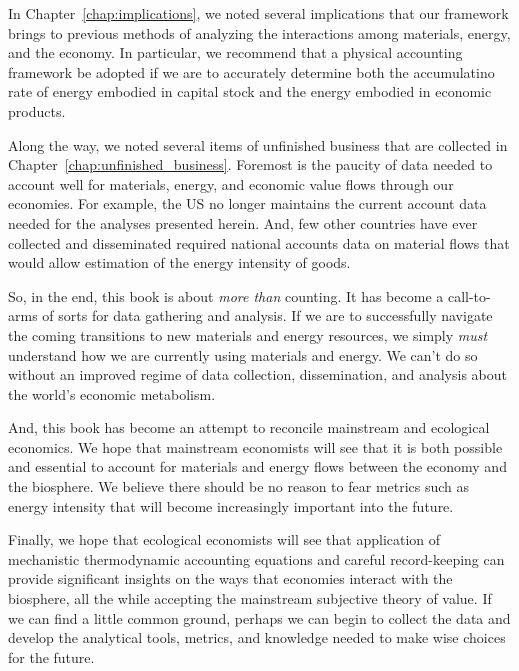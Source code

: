In Chapter~\ref{chap:implications}, we noted several implications
that our framework brings to previous methods of analyzing 
the interactions among materials, energy, and the economy.
In particular, we recommend that a physical accounting framework
be adopted if we are to accurately determine
both the accumulatino rate of energy embodied in capital stock
and the energy embodied in economic products.

Along the way, we noted several items of unfinished business
that are collected in Chapter~\ref{chap:unfinished_business}.
Foremost is the paucity of data
needed to account well for materials, energy, and economic
value flows through our economies.
For example, the US no longer maintains the current account data
needed for the analyses presented herein.
And, few other countries have ever collected and disseminated
required national accounts data on material flows that would allow
estimation of the energy intensity of goods.

\vspace{10 mm}

So, in the end, this book is about \emph{more than} counting.
It has become a call-to-arms of sorts for data gathering and analysis.
If we are to successfully navigate the coming transitions
to new materials and energy resources, we simply \emph{must}
understand how we are currently using 
materials and energy.
We can't do so without an improved regime 
of data collection, dissemination, and analysis
about the world's economic metabolism.

And, this book has become an attempt to reconcile 
mainstream and ecological economics. 
We hope that mainstream economists will see that it is 
both possible and essential to account for materials and energy flows
between the economy and the biosphere.
We believe there should be no reason to fear metrics such as energy intensity
that will become increasingly important into the future.

Finally, we hope that ecological economists will see that 
application of mechanistic thermodynamic accounting equations
and careful record-keeping can provide significant
insights on the ways that economies interact
with the biosphere, all the while accepting the 
mainstream subjective theory of value.
If we can find a little common ground, perhaps we can begin
to collect the data and develop the analytical tools, metrics, and knowledge
needed to make wise choices for the future.


\cleardoublepage{} %

